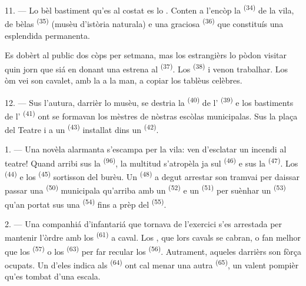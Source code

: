 \VUsaut{4.0mm}
\VUsaut{3.4mm}

11. --- Lo bèl bastiment qu'es al costat es lo . Conten a l'encòp la
 \textsuperscript{(34)} de la vila, de bèlas
 \textsuperscript{(35)} (musèu
d'istòria naturala) e una graciosa 
\textsuperscript{(36)} que constituís una esplendida 
permanenta.

Es dobèrt al public dos còps per setmana, mas los estrangièrs lo pòdon visitar
quin jorn que siá en donant una estrena al  \textsuperscript{(37)}.
Los  \textsuperscript{(38)} i venon trabalhar. Los òm vei
 son cavalet, amb la  a la man, a copiar los
tablèus celèbres.

12. --- Sus l'autura, darrièr lo musèu, se destria la 
\textsuperscript{(40)} de l' \textsuperscript{(39)} e los
bastiments de l' \textsuperscript{(41)} ont se formavan los
mèstres de nòstras escòlas municipalas. Sus la plaça del Teatre i a un
 \textsuperscript{(43)} installat dins un  \textsuperscript{(42)}.

\VUsaut{5.0mm}
\VUsaut{3.0mm}

\VUsaut{3.4mm}

1. --- Una novèla alarmanta s'escampa per la vila: ven d'esclatar un incendi al
teatre! Quand arribi sus la  \textsuperscript{(96)}, la multitud
s'atropèla ja sul  \textsuperscript{(46)} e sus la
 \textsuperscript{(47)}. Los 
\textsuperscript{(44)} e los  \textsuperscript{(45)} sortisson del
burèu. Un  \textsuperscript{(48)} a degut arrestar son
tramvai per daissar passar una  \textsuperscript{(50)}
municipala qu'arriba amb un  \textsuperscript{(52)} e un
 \textsuperscript{(51)} per suènhar un 
\textsuperscript{(53)} qu'an portat sus una 
\textsuperscript{(54)} fins a prèp del 
\textsuperscript{(55)}.

2. --- Una companhiá d'infantariá que tornava de l'exercici s'es arrestada per
mantenir l'òrdre amb los  \textsuperscript{(61)} a
caval. Los , que lors cavals se cabran, o fan melhor que los
 \textsuperscript{(57)} o los 
\textsuperscript{(63)} per far recular los 
\textsuperscript{(56)}. Autrament, aqueles darrièrs son fòrça ocupats. Un d'eles
indica als  \textsuperscript{(64)} ont cal menar una
autra  \textsuperscript{(65)}, un valent pompièr qu'es tombat
d'una escala.

